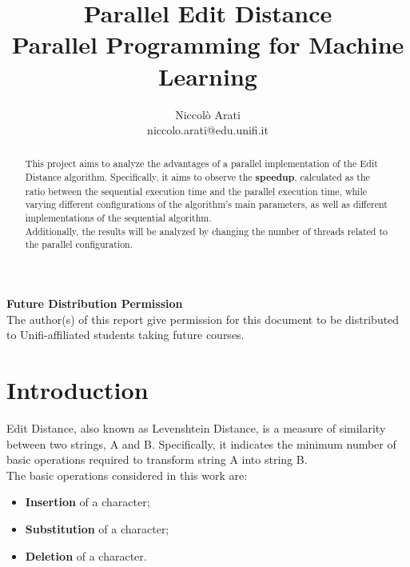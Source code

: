 \documentclass[10pt,twocolumn,letterpaper]{article}
\newcommand{\bit} {\begin{itemize} }
\newcommand{\eit} {\end{itemize} }
\begin{document}
\title{Parallel Edit Distance\\
\large Parallel Programming for Machine Learning}

\author{Niccolò Arati\\
niccolo.arati@edu.unifi.it\\
}

\maketitle
\thispagestyle{empty}

\begin{abstract}
This project aims to analyze the advantages of a parallel implementation of the Edit Distance algorithm. Specifically, it aims to observe the \textbf{speedup}, calculated as the ratio between the sequential execution time and the parallel execution time, while varying different configurations of the algorithm's main parameters, as well as different implementations of the sequential algorithm.\\
Additionally, the results will be analyzed by changing the number of threads related to the parallel configuration.

\end{abstract}

\noindent\large\textbf{Future Distribution Permission}\\
\indent The author(s) of this report give permission for this document to be distributed to Unifi-affiliated students taking future courses.


\section{Introduction}

Edit Distance, also known as Levenshtein Distance, is a measure of similarity between two strings, A and B. Specifically, it indicates the minimum number of basic operations required to transform string A into string B.\\
The basic operations considered in this work are:

\bit
    \item{\textbf{Insertion} of a character;}
    \item{\textbf{Substitution} of a character;}
    \item{\textbf{Deletion} of a character.}
\eit
\end{document}
